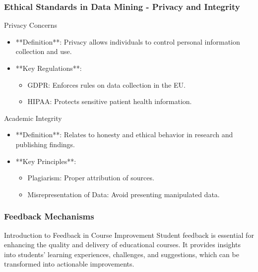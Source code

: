 \documentclass[aspectratio=169]{beamer}
\begin{document}
\begin{frame}[fragile]
    \frametitle{Ethical Standards in Data Mining - Privacy and Integrity}
    \begin{block}{Privacy Concerns}
        \begin{itemize}
            \item **Definition**: Privacy allows individuals to control personal information collection and use.
            \item **Key Regulations**:
                \begin{itemize}
                    \item GDPR: Enforces rules on data collection in the EU.
                    \item HIPAA: Protects sensitive patient health information.
                \end{itemize}
        \end{itemize}
    \end{block}

    \begin{block}{Academic Integrity}
        \begin{itemize}
            \item **Definition**: Relates to honesty and ethical behavior in research and publishing findings.
            \item **Key Principles**:
                \begin{itemize}
                    \item Plagiarism: Proper attribution of sources.
                    \item Misrepresentation of Data: Avoid presenting manipulated data.
                \end{itemize}
        \end{itemize}
    \end{block}
\end{frame}

\begin{frame}[fragile]
    \frametitle{Feedback Mechanisms}
    
    \begin{block}{Introduction to Feedback in Course Improvement}
        Student feedback is essential for enhancing the quality and delivery of educational courses. It provides insights into students’ learning experiences, challenges, and suggestions, which can be transformed into actionable improvements.
    \end{block}
\end{frame}
\end{document}
